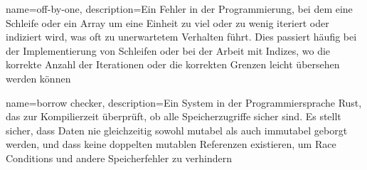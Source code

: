 {
    name={off-by-one},
    description={Ein Fehler in der Programmierung, bei dem eine Schleife oder ein Array um eine Einheit zu viel oder zu wenig iteriert oder indiziert wird, was oft zu unerwartetem Verhalten führt. Dies passiert häufig bei der Implementierung von Schleifen oder bei der Arbeit mit Indizes, wo die korrekte Anzahl der Iterationen oder die korrekten Grenzen leicht übersehen werden können}
}

{
    name={borrow checker},
    description={Ein System in der Programmiersprache Rust, das zur Kompilierzeit überprüft, ob alle Speicherzugriffe sicher sind. Es stellt sicher, dass Daten nie gleichzeitig sowohl mutabel als auch immutabel geborgt werden, und dass keine doppelten mutablen Referenzen existieren, um Race Conditions und andere Speicherfehler zu verhindern}
}


\glsaddall
